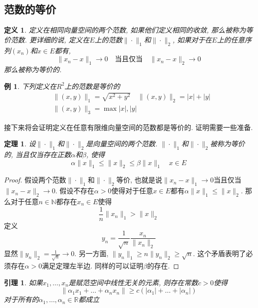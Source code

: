 \documentclass{book}
\newtheorem{definition}{\hspace{2em}定义}[section]
\newtheorem{theorem}{\hspace{2em}定理}[section]
\newtheorem{lemma}{\hspace{2em}引理}[section]
\newtheorem{proof}{证明}[section]
\newtheorem{example}{例}[section]
\begin{document}
\subsection*{范数的等价}
\begin{definition}
  定义在相同向量空间的两个范数, 如果他们定义相同的收敛, 那么被称为等价范数. 更详细的说, 定义在$E$上的范数$\|\cdot\|_1$和$\|\cdot\|_2$, 如果对于在$E$上的任意序列$(x_n)$和$x\in E$都有,
  \begin{equation*}
    \|x_n-x\|_1\to 0 \quad \text{当且仅当}\quad \|x_n-x\|_2\to 0
  \end{equation*}
  那么被称为等价的.
\end{definition}
\begin{example}
  下列定义在$R^2$上的范数是等价的
  \begin{equation*}
  \begin{split}
       &\|(x,y)\|_1=\sqrt{x^2+y^2}\quad \|(x,y)\|_2=|x|+|y| \\
       &\|(x,y)\|_3=\max{|x|,|y|}
  \end{split}
  \end{equation*}
\end{example}
接下来将会证明定义在任意有限维向量空间的范数都是等价的. 证明需要一些准备.
\begin{theorem}\label{norm equivalence}
  设$\|\cdot\|_1$和$\|\cdot\|_2$是向量空间的两个范数. $\|\cdot\|_1$和$\|\cdot\|_2$被称为等价的, 当且仅当存在正数$\alpha$和$\beta$, 使得
  \begin{equation*}
    \alpha\|x\|_1\leq\|x\|_2\leq\beta\|x\|_1\quad x\in E
  \end{equation*}
\end{theorem}
\begin{proof}
  假设两个范数$\|\cdot\|_1$和$\|\cdot\|_2$等价, 也就是说$\|x_n-x\|_1\to 0$当且仅当$\|x_n-x\|_2\to 0$. 假设不存在$\alpha>0$使得对于任意$x\in E$都有$\alpha\|x\|_1\leq\|x\|_2$. 那么对于任意$n\in \mathbb{N}$都存在$x_n\in E$使得
  \begin{equation*}
    \frac{1}{n}\|x_n\|_1>\|x\|_2
  \end{equation*}
  定义
  \begin{equation*}
    y_n=\frac{1}{\sqrt{n}}\frac{x_n}{\|x_n\|_2}
  \end{equation*}
  显然$\|y_n\|_2=\frac{1}{\sqrt{n}}\to 0$. 另一方面, $\|y_n\|_1\geq n\|y_n\|_2\geq \sqrt{n}$. 这个矛盾表明了必须存在$\alpha>0$满足定理左半边. 同样的可以证明$\beta$的存在.
\end{proof}
\begin{lemma}\label{norm Lemma}
  如果$x_1,\dots,x_n$是赋范空间中线性无关的元素, 则存在常数$c>0$使得
  \begin{equation}\label{norm lemma}
    \|\alpha_1x_1+\dots+\alpha_nx_n\|\geq c(|\alpha_1|+\dots+|\alpha_n|)
  \end{equation}
  对于所有的$\alpha_1,\dots,\alpha_n\in\mathbb{R}$都成立
\end{lemma}
\end{document}
